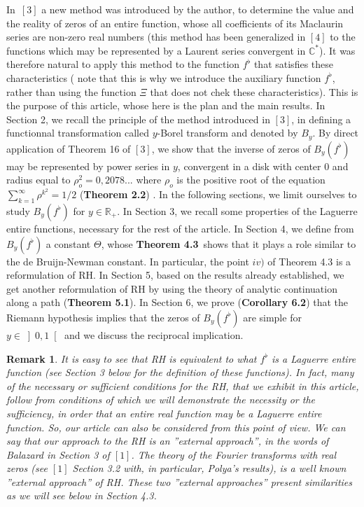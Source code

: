 \documentclass{article}
\newtheorem{remark}{Remark}
\begin{document}
In\ $\left[ 3\right] $ a new method was introduced by the author, to
determine the value and the reality of zeros of an entire function, whose
all coefficients of its Maclaurin series are non-zero real numbers (this
method has been generalized in $\left[ 4\right] $ to the functions which may
be represented by a Laurent series convergent in $\mathbb{C}^{\ast }$). It
was therefore natural to apply this method to the function $f^{\flat }$ that
satisfies these characteristics ( note that this is why we introduce the
auxiliary function $f^{\flat }$, rather than using the function $\Xi $ that
does not chek these characteristics). This is the purpose of this article,
whose here is the plan and the main results. In Section 2, we recall the
principle of the method introduced in $\left[ 3\right] $, in defining a
functionnal transformation called $y$-Borel transform and denoted by $B_{y}$. By direct application of Theorem 16 of $\left[ 3\right] $, we show that
the inverse of zeros of $B_{y}\left( f^{\flat }\right) $ may be represented
by power series in $y$, convergent in a disk with center $0$ and radius
equal to $\rho _{o}^{2}=0,2078...$ where $\rho _{o}$ is the positive root of
the equation $\sum_{k=1}^{\infty }\rho ^{k^{2}}=1/2$ (\textbf{Theorem 2.2})
. In the following sections, we limit ourselves to study $B_{y}\left(
f^{\flat }\right) $ for $y\in \mathbb{R}_{+}$. In Section 3, we recall some
properties of the Laguerre entire functions, necessary for the rest of the
article. In Section 4, we define from $B_{y}\left( f^{\flat }\right) $ a
constant $\Theta $, whose \textbf{Theorem 4.3}\ shows that it plays a role
similar to the de Bruijn-Newman constant. In particular, the point $iv)$ of
Theorem 4.3 is a reformulation of RH. In Section 5, based on the results
already established, we get another reformulation of RH by using the theory
of analytic continuation along a path (\textbf{Theorem 5.1}). In Section 6,
we prove (\textbf{Corollary 6.2}) that the Riemann hypothesis implies that
the zeros of $B_{y}\left( f^{\flat }\right) $ are simple for $y\in \left] 0,1\right[ $ and we discuss the reciprocal implication.

\bigskip

\begin{remark}
It is easy to see that RH is equivalent to what $f^{\flat }$ is a Laguerre
entire function (see Section 3 below for the definition of these functions).
In fact, many of the necessary or sufficient conditions for the RH, that we
exhibit in this article, follow from conditions of which we will demonstrate
the necessity or the sufficiency, in order that an entire real function may
be a Laguerre entire function. So, our article can also be considered from
this point of view. We can say that our approach to the RH is an ''external
approach'', in the words of Balazard in Section 3 of $\left[ 1\right] $. The
theory of the Fourier transforms with real zeros (see $\left[ 1\right] $
Section 3.2 with, in particular, Polya's results), is a well known
''external approach'' of RH. These two ''external approaches'' present
similarities as we will see below in Section 4.3.
\end{remark}
\end{document}
